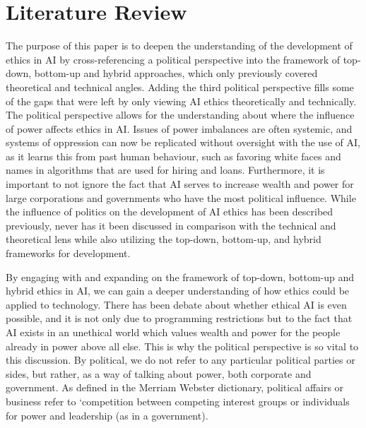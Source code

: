\documentclass{svproc}
\begin{document}
\section{Literature Review}
%
The purpose of this paper is to deepen the understanding of the development of ethics in AI by cross-referencing a political perspective into the framework of top-down, bottom-up and hybrid approaches, which only previously covered theoretical and technical angles. \cite{Allen2005ArtificialApproaches} Adding the third political perspective fills some of the gaps that were left by only viewing AI ethics theoretically and technically. The political perspective allows for the understanding about where the influence of power affects ethics in AI. Issues of power imbalances are often systemic, and systems of oppression can now be replicated without oversight with the use of AI, as it learns this from past human behaviour, such as favoring white faces and names in algorithms that are used for hiring and loans. \cite{Martin2019EthicalAlgorithms} Furthermore,  it is important to not ignore the fact that AI serves to increase wealth and power for large corporations and governments who have the most political influence. \cite{Whittlestone2019TheEthics} While the influence of politics on the development of AI ethics has been described previously, never has it been discussed in comparison with the technical and theoretical lens while also utilizing the top-down, bottom-up, and hybrid frameworks for development.

By engaging with and expanding on the framework of top-down, bottom-up and hybrid ethics in AI, we can gain a deeper understanding of how ethics could be applied to technology. There has been debate about whether ethical AI is even possible, \cite{Phan2021EconomiesTech} and it is not only due to programming restrictions but to the fact that AI exists in an unethical world which values wealth and power for the people already in power above all else. \cite{Phan2021EconomiesTech} This is why the political perspective is so vital to this discussion. By political, we do not refer to any particular political parties or sides, but rather, as a way of talking about power, both corporate and government. As defined in the Merriam Webster dictionary, political affairs or business refer to ‘competition between competing interest groups or individuals for power and leadership (as in a government). \cite{Merriam-Webster2022Merriam-Webster}
\end{document}
